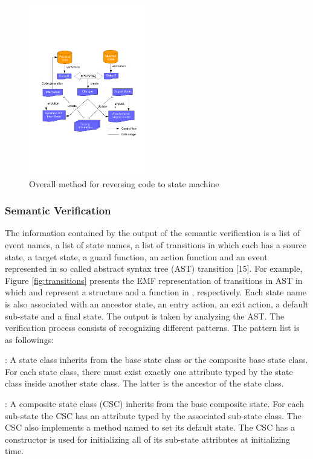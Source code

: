 \begin{figure}
\centering
\includegraphics[clip, trim=1cm 7cm 0.1cm 7.8cm, width=0.47\textwidth]{figures/details.pdf}
\caption{Overall method for reversing code to state machine} 
\label{fig:details}
\end{figure}

\subsubsection{Semantic Verification}
The information contained by the output of the semantic verification is a list of event names, a list of state names, a list of transitions in which each has a source state, a target state, a guard function, an action function and an event represented in so called abstract syntax tree (AST) transition [15]. For example, Figure \ref{fig:transitions} presents the EMF \cite{gronback_eclipse_} representation of transitions in  AST in which  and  represent a structure and a function in , respectively. Each state name is also associated with an ancestor state, an entry action, an exit action, a default sub-state and a final state. The output is taken by analyzing the AST. The verification process consists of recognizing different patterns. The pattern list is as followings:

: A state class inherits from the base state class or the composite base state class. For each state class, there must exist exactly one attribute typed by the state class inside another state class. The latter is the ancestor of the state class.

: A composite state class (CSC) inherits from the base composite state. For each sub-state the CSC has an attribute typed by the associated sub-state class. The CSC also implements a method named  to set its default state. The CSC has a constructor is used for initializing all of its sub-state attributes at initializing time.

